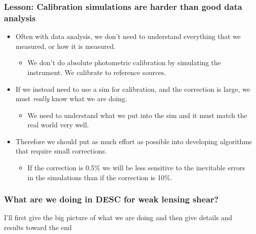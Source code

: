 \documentclass{beamer}
\begin{document}
\frame
{

    \frametitle{Lesson: Calibration simulations are harder than good data analysis}


    \begin{itemize}

        \item Often with data analysis, we don't need to understand everything that
            we measured, or how it is measured.

            \begin{itemize}

                \item We don't do absolute photometric calibration by
                    simulating the instrument.  We calibrate to reference
                    sources.

            \end{itemize}

        \item If we instead need to use a sim for calibration, and the correction is large,
            we must {\em really} know what we are doing.

            \begin{itemize}
           
                \item We need to understand what we put into the sim and it
                    must match the real world very well.
            \end{itemize}

        \item Therefore we should put as much effort as possible into developing
            algorithms that require small corrections.

            \begin{itemize}
    
                \item If the correction is 0.5\% we will be less sensitive to the
                    inevitable errors in the simulations than if the correction is 10\%.

            \end{itemize}

    \end{itemize}

}

\frame
{

    \frametitle{What are we doing in DESC for weak lensing shear?}



    {\Large I'll first give the big picture of what we are doing and then give
    details and results toward the end }


}
\end{document}
